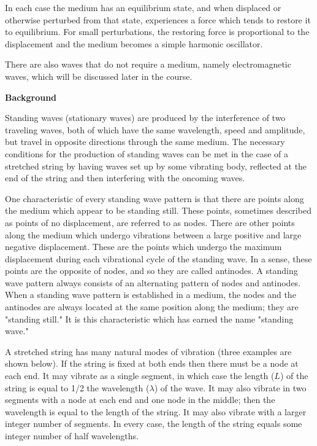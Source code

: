 In each case the medium has an equilibrium state, and when displaced or otherwise perturbed from that state, experiences a force which tends to restore it to equilibrium. For small perturbations, the restoring force is proportional to the displacement and the medium becomes a simple harmonic oscillator.

There are also waves that do not require a medium, namely electromagnetic waves, which will be discussed later in the course.

\textbf{Background}

Standing waves (stationary waves) are produced by the interference of two traveling waves, both of which have the
same wavelength, speed and amplitude, but travel in opposite directions through the same medium. The necessary conditions for the production of
standing waves can be met in the case of a stretched string by having waves set up by some vibrating body, reflected at the end of the string and then interfering with the oncoming waves.

One characteristic of every standing wave pattern is that there are points along the medium which appear to be standing still. These points, sometimes described as points of no displacement, are referred to as nodes. There are other points along the medium which undergo vibrations between a large positive and large negative displacement. These are the points which undergo the maximum displacement during each vibrational cycle of the standing wave. In a sense, these points are the opposite of nodes, and so they are called antinodes. A standing wave pattern always consists of an alternating pattern of nodes and antinodes. When a standing wave pattern is established in a medium, the nodes and the antinodes are always located at the same position along the medium; they are "standing still." It is this characteristic which has earned the name "standing wave."

A stretched string has many natural modes of vibration (three examples are shown below). If the string is fixed at both ends then there must be a node at each end. It may vibrate as a single segment, in which case the length ($L$) of the string is equal to 1/2 the wavelength ($\lambda $) of the wave. It may also vibrate in two segments with a node at each end and one node in the middle; then the wavelength is equal to the length of the string. It may also vibrate with a larger integer number of segments. In every case, the length of the string equals some integer number of half wavelengths.

